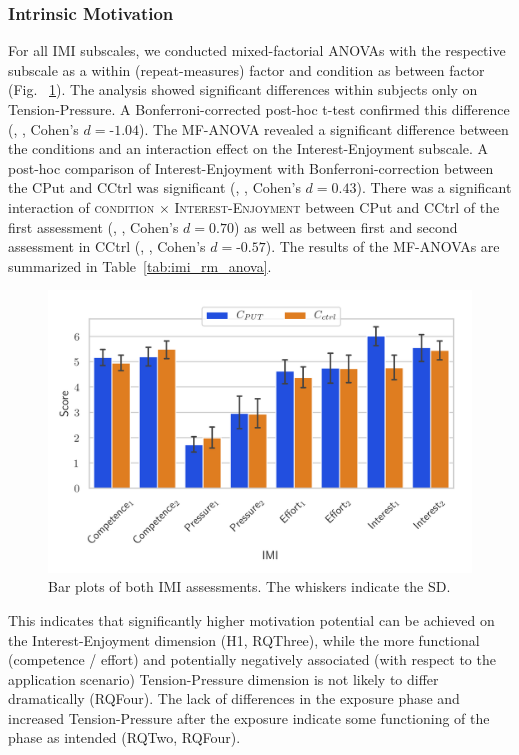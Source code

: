 \subsubsection*{Intrinsic Motivation}
%
For all IMI subscales, we conducted mixed-factorial ANOVAs with the respective subscale as a within (repeat-measures) factor and condition as between factor (Fig. ~\ref{fig:imi_combined}). The analysis showed significant differences within subjects only on Tension-Pressure. A Bonferroni-corrected post-hoc t-test confirmed this difference (, , Cohen's $d{=}{\text{-}}1.04$). 
The MF-ANOVA revealed a significant difference between the conditions and an interaction effect on the Interest-Enjoyment subscale. A post-hoc comparison of Interest-Enjoyment with Bonferroni-correction between the \acl{CPut} and \acl{CCtrl} was significant (, , Cohen's $d{=}0.43$). There was a significant interaction of \textsc{condition} $\times$ \textsc{Interest-Enjoyment} between \acl{CPut} and \acl{CCtrl} of the first assessment (, , Cohen's $d{=}0.70$) as well as between first and second assessment in \acl{CCtrl} (, , Cohen's $d{=}{\text{-}}0.57$).
The results of the MF-ANOVAs are summarized in Table~\ref{tab:imi_rm_anova}.
\begin{figure}[t!]
\centering
\includegraphics[width=\linewidth,keepaspectratio]{img/plots/imi_combined.png}
\caption[]{Bar plots of both IMI assessments. The whiskers indicate the SD. \label{fig:imi_combined}}
\end{figure}
This indicates that significantly higher motivation potential can be achieved on the Interest-Enjoyment dimension (H1, \acl{RQThree}), while the more functional (competence / effort) and potentially negatively associated (with respect to the application scenario) Tension-Pressure dimension is not likely to differ dramatically (\acl{RQFour}). The lack of differences in the exposure phase and increased Tension-Pressure after the exposure indicate some functioning of the phase as intended (\acl{RQTwo}, \acl{RQFour}).


